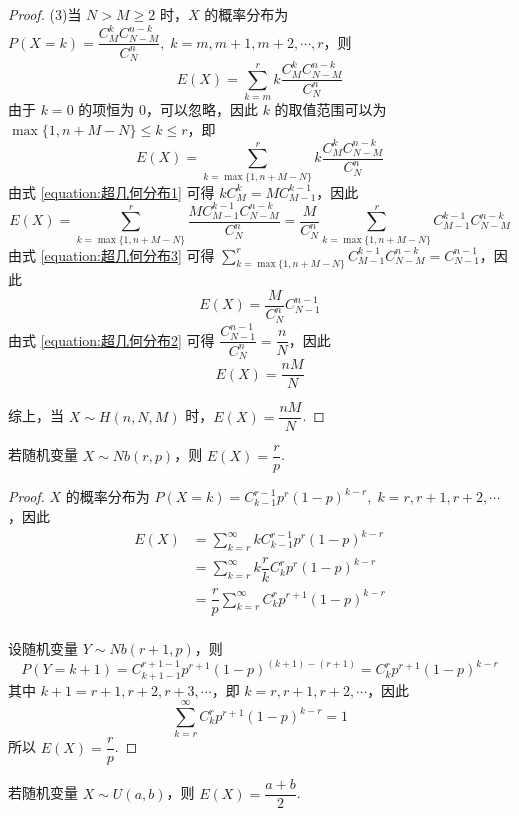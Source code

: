 \begin{proof}
    (3)当 $N>M \geqslant 2$ 时，$X$ 的概率分布为 $P(X=k) = \dfrac{C_M^k C_{N-M}^{n-k}}{C_N^n},\; k = m, m+1, m+2, \cdots, r$，则
    $$
    E(X) = \sum_{k=m}^r k \dfrac{C_M^k C_{N-M}^{n-k}}{C_N^n}
    $$
    由于 $k=0$ 的项恒为 $0$，可以忽略，因此 $k$ 的取值范围可以为 $\max\{ 1, n+M-N \} \leqslant k \leqslant r$，即
    $$
    E(X) = \sum_{k=\max\{ 1, n+M-N \}}^r k \dfrac{C_M^k C_{N-M}^{n-k}}{C_N^n}
    $$
    由式 \eqref{equation:超几何分布1} 可得 $k C_M^k = M C_{M-1}^{k-1}$，因此
    $$
    E(X) = \sum_{k=\max\{ 1, n+M-N \}}^{r} \dfrac{M C_{M-1}^{k-1} C_{N-M}^{n-k}}{C_N^n} = \dfrac{M}{C_N^n} \sum_{k=\max\{ 1, n+M-N \}}^{r} C_{M-1}^{k-1} C_{N-M}^{n-k}
    $$
    由式 \eqref{equation:超几何分布3} 可得 $\displaystyle\sum_{k=\max\{ 1, n+M-N \}}^{r} C_{M-1}^{k-1} C_{N-M}^{n-k} = C_{N-1}^{n-1}$，因此
    $$
    E(X) = \dfrac{M}{C_N^n} C_{N-1}^{n-1}
    $$
    由式 \eqref{equation:超几何分布2} 可得 $\dfrac{C_{N-1}^{n-1}}{C_N^n} = \dfrac{n}{N}$，因此
    $$
    E(X) = \dfrac{nM}{N}
    $$

    综上，当 $X \sim H(n,N,M)$ 时，$E(X) = \dfrac{nM}{N}$.
\end{proof}

\begin{conclusion}
    \indent 若随机变量 $X \sim Nb(r,p)$，则 $E(X) = \dfrac{r}{p}$.
\end{conclusion}

\begin{proof}
    $X$ 的概率分布为 $P(X=k) = C_{k-1}^{r-1} p^r (1-p)^{k-r},\; k = r, r+1, r+2, \cdots$，因此
    $$
    \begin{aligned}
        E(X) &= \sum_{k=r}^{\infty} k C_{k-1}^{r-1} p^r (1-p)^{k-r} \\
        &= \sum_{k=r}^{\infty} k \dfrac{r}{k} C_{k}^{r} p^r (1-p)^{k-r} \\
        &= \dfrac{r}{p} \sum_{k=r}^{\infty} C_{k}^{r} p^{r+1} (1-p)^{k-r} \\
    \end{aligned}
    $$

    设随机变量 $Y \sim Nb(r+1, p)$，则
    $$
    P(Y=k+1) = C_{k+1-1}^{r+1-1} p^{r+1} (1-p)^{(k+1)-(r+1)} = C_{k}^{r} p^{r+1} (1-p)^{k-r}
    $$
    其中 $k+1 = r+1, r+2, r+3, \cdots$，即 $k = r, r+1, r+2, \cdots$，因此
    $$
    \sum_{k=r}^{\infty} C_{k}^{r} p^{r+1} (1-p)^{k-r} = 1
    $$
    所以 $E(X) = \dfrac{r}{p}$.
\end{proof}

\begin{conclusion}
    \indent 若随机变量 $X \sim U(a,b)$，则 $E(X) = \dfrac{a+b}{2}$.
\end{conclusion}

